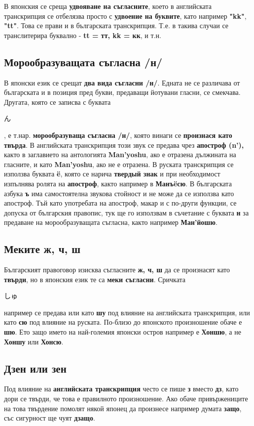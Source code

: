 В японския се среща\textbf{ удвояване на съгласните}, което в английската транскрипция се отбелязва
просто с \textbf{удвоение на буквите}, като например \textbf{"kk"}, \textbf{"tt"}. Това се прави и в българската транскрипция. Т.е. в такива случаи се транслитерира буквално - \textbf{tt = тт, kk = кк}, и т.н.

\subsection{Морообразуващата съгласна /н/}
В японски език се срещат \textbf{два вида съгласни /н/}. Едната не се различава от българската и в позиция пред букви, предаващи йотувани гласни, се смекчава. Другата, която се записва с буквата \begin{CJK*}{UTF8}{song}ん\end{CJK*}, е т.нар. \textbf{морообразуваща съгласна /н/}, която винаги се \textbf{произнася като} \textbf{твърда}. В английската транскрипция този звук се предава чрез \textbf{апостроф (n’),} както в заглавието на антологията \textbf{Man’y\-osh\-u}, ако е отразена дължината на гласните, и като \textbf{Man’yoshu}, ако не е отразена.
В руската транскрипция се използва буквата \textbf{\"e}, която се нарича \textbf{твердый знак} и при необходимост изпълнява ролята на \textbf{апостроф}, както например в \textbf{Манъ\"eсю}.
В българската азбука \textbf{ъ} има самостоятелна звукова стойност и не може да се използва като апостроф. Тъй като употребата на апостроф, макар и с по-други функции, се допуска от българския правопис, тук ще го използвам в съчетание с буквата \textbf{н} за предаване на морообразуващата съгласна, както например \textbf{Ман’йошю}.

\subsection{Меките ж, ч, ш}
Българският правоговор изисква съгласните \textbf{ж, ч, ш} да се произнасят като \textbf{твърди}, но в японския език те са \textbf{меки съгласни}. Сричката 
\begin{CJK*}{UTF8}{song}しゅ\end{CJK*} например се предава или като \textbf{шу} под влияние на английската транскрипция, или като \textbf{сю} под влияние на руската. По-близо до японското произношение обаче е \textbf{шю}. Ето защо името на най-големия японски остров например е \textbf{Хоншю}, а не \textbf{Хоншу} или \textbf{Хонсю}.

\subsection{Дзен или зен}
Под влияние на \textbf{английската транскрипция} често се пише \textbf{з} вместо \textbf{дз}, като дори се твърди, че това е правилното произношение. Ако обаче привържениците на това твърдение помолят някой японец да произнесе например думата \textbf{защо}, със сигурност ще чуят \textbf{дзащо}.

